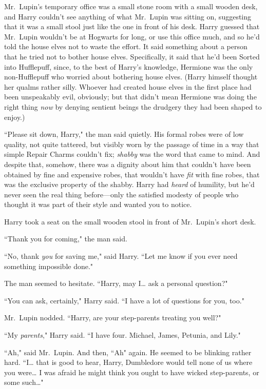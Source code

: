 \later

Mr.~Lupin's temporary office was a small stone room with a small wooden desk, and Harry couldn't see anything of what Mr.~Lupin was sitting on, suggesting that it was a small stool just like the one in front of his desk. Harry guessed that Mr.~Lupin wouldn't be at Hogwarts for long, or use this office much, and so he'd told the house elves not to waste the effort. It said something about a person that he tried not to bother house elves. Specifically, it said that he'd been Sorted into Hufflepuff, since, to the best of Harry's knowledge, Hermione was the only non-Hufflepuff who worried about bothering house elves. (Harry himself thought her qualms rather silly. Whoever had created house elves in the first place had been unspeakably evil, obviously; but that didn't mean Hermione was doing the right thing \emph{now} by denying sentient beings the drudgery they had been shaped to enjoy.)

``Please sit down, Harry," the man said quietly. His formal robes were of low quality, not quite tattered, but visibly worn by the passage of time in a way that simple Repair Charms couldn't fix; \emph{shabby} was the word that came to mind. And despite that, somehow, there was a dignity about him that couldn't have been obtained by fine and expensive robes, that wouldn't have \emph{fit} with fine robes, that was the exclusive property of the shabby. Harry had \emph{heard} of humility, but he'd never seen the real thing before—only the satisfied modesty of people who thought it was part of their style and wanted you to notice.

Harry took a seat on the small wooden stool in front of Mr.~Lupin's short desk.

``Thank you for coming," the man said.

``No, thank \emph{you} for saving me," said Harry. ``Let me know if you ever need something impossible done."

The man seemed to hesitate. ``Harry, may I{\ldots} ask a personal question?"

``You can ask, certainly," Harry said. ``I have a lot of questions for you, too."

Mr.~Lupin nodded. ``Harry, are your step-parents treating you well?"

``My \emph{parents}," Harry said. ``I have four. Michael, James, Petunia, and Lily."

``Ah," said Mr.~Lupin. And then, ``Ah" again. He seemed to be blinking rather hard. ``I{\ldots} that is good to hear, Harry, Dumbledore would tell none of us where you were{\ldots} I was afraid he might think you ought to have wicked step-parents, or some such{\ldots}"

